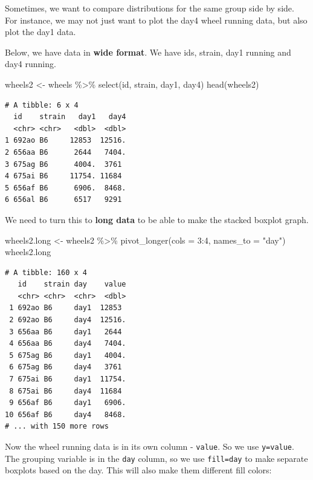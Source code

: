 \documentclass[
  letterpaper,
  DIV=11,
  numbers=noendperiod]{scrreprt}
\newenvironment{Shaded}{\begin{snugshade}}{\end{snugshade}}
\newcommand{\AttributeTok}[1]{\textcolor[rgb]{0.40,0.45,0.13}{#1}}
\newcommand{\DecValTok}[1]{\textcolor[rgb]{0.68,0.00,0.00}{#1}}
\newcommand{\FunctionTok}[1]{\textcolor[rgb]{0.28,0.35,0.67}{#1}}
\newcommand{\NormalTok}[1]{\textcolor[rgb]{0.00,0.23,0.31}{#1}}
\newcommand{\OtherTok}[1]{\textcolor[rgb]{0.00,0.23,0.31}{#1}}
\newcommand{\SpecialCharTok}[1]{\textcolor[rgb]{0.37,0.37,0.37}{#1}}
\newcommand{\StringTok}[1]{\textcolor[rgb]{0.13,0.47,0.30}{#1}}
\begin{document}
Sometimes, we want to compare distributions for the same group side by
side. For instance, we may not just want to plot the day4 wheel running
data, but also plot the day1 data.

Below, we have data in \textbf{wide format}. We have ids, strain, day1
running and day4 running.

\begin{Shaded}
\begin{Highlighting}[]
\NormalTok{wheels2 }\OtherTok{\textless{}{-}}\NormalTok{ wheels }\SpecialCharTok{\%\textgreater{}\%} \FunctionTok{select}\NormalTok{(id, strain, day1, day4)}
\FunctionTok{head}\NormalTok{(wheels2)}
\end{Highlighting}
\end{Shaded}

\begin{verbatim}
# A tibble: 6 x 4
  id    strain   day1   day4
  <chr> <chr>   <dbl>  <dbl>
1 692ao B6     12853  12516.
2 656aa B6      2644   7404.
3 675ag B6      4004.  3761 
4 675ai B6     11754. 11684 
5 656af B6      6906.  8468.
6 656al B6      6517   9291 
\end{verbatim}

We need to turn this to \textbf{long data} to be able to make the
stacked boxplot graph.

\begin{Shaded}
\begin{Highlighting}[]
\NormalTok{wheels2.long }\OtherTok{\textless{}{-}}\NormalTok{ wheels2 }\SpecialCharTok{\%\textgreater{}\%} \FunctionTok{pivot\_longer}\NormalTok{(}\AttributeTok{cols =} \DecValTok{3}\SpecialCharTok{:}\DecValTok{4}\NormalTok{, }\AttributeTok{names\_to =} \StringTok{"day"}\NormalTok{)}
\NormalTok{wheels2.long}
\end{Highlighting}
\end{Shaded}

\begin{verbatim}
# A tibble: 160 x 4
   id    strain day    value
   <chr> <chr>  <chr>  <dbl>
 1 692ao B6     day1  12853 
 2 692ao B6     day4  12516.
 3 656aa B6     day1   2644 
 4 656aa B6     day4   7404.
 5 675ag B6     day1   4004.
 6 675ag B6     day4   3761 
 7 675ai B6     day1  11754.
 8 675ai B6     day4  11684 
 9 656af B6     day1   6906.
10 656af B6     day4   8468.
# ... with 150 more rows
\end{verbatim}

Now the wheel running data is in its own column - \texttt{value}. So we
use \texttt{y=value}. The grouping variable is in the \texttt{day}
column, so we use \texttt{fill=day} to make separate boxplots based on
the day. This will also make them different fill colors:
\end{document}
